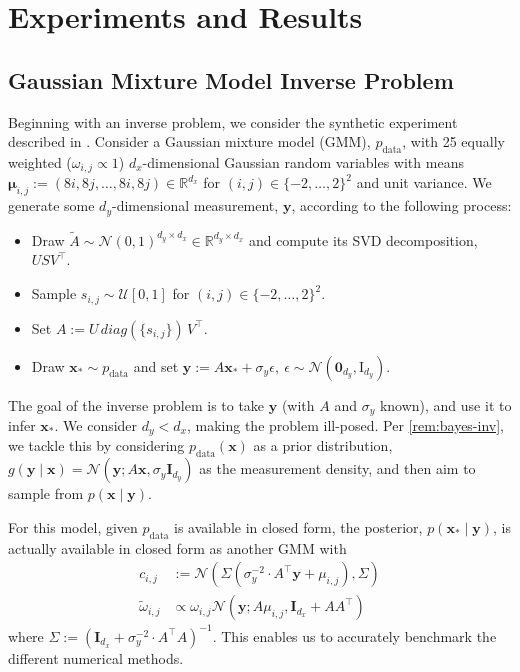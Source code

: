 \chapter{Experiments and Results} \label{chap:experiments}

\section{Gaussian Mixture Model Inverse Problem} \label{sec:gmm}

Beginning with an inverse problem, we consider the synthetic experiment described in
\textcite{cardosoMonteCarloGuided2023,boysTweedieMomentProjected2023}.
Consider a Gaussian mixture model (GMM), $p_{\text{data}}$, with 25 equally weighted
($\omega_{i,j} \propto 1$) $d_x$-dimensional Gaussian random variables with means
$\mathbf{\mu}_{i,j} := (8i, 8j, \dots, 8i, 8j) \in \mathbb{R}^{d_x}$
for $(i, j)\in \{-2, \ldots, 2\}^2$ and unit variance.
We generate some $d_y$-dimensional measurement, $\mathbf{y}$, according to the following process:
\begin{itemize}
    \item Draw $\tilde{A} \sim \mathcal{N}(0, 1)^{d_y \times d_x} \in \mathbb{R}^{d_y \times d_x}$
    and compute its SVD decomposition, $USV^\top$.
    \item Sample $s_{i,j} \sim \mathcal{U}[0,1]$ for $(i,j) \in \{-2, \dots, 2\}^2$.
    \item Set $A := U\, diag(\{s_{i,j}\})\, V^\top$.
    \item Draw $\mathbf{x}_* \sim p_{\text{data}}$ and set $\mathbf{y} := A\mathbf{x}_* + \sigma_y\epsilon,\ \epsilon \sim \mathcal{N}(\mathbf{0}_{d_y}, \mathrm{I}_{d_y})$.
\end{itemize}

The goal of the inverse problem is to take $\mathbf{y}$ (with $A$ and $\sigma_y$ known), and use
it to infer $\mathbf{x}_*$. We consider $d_y < d_x$, making the problem ill-posed. Per
\autoref{rem:bayes-inv}, we tackle this by considering $p_{\text{data}}(\mathbf{x})$ as a prior
distribution,
$g(\mathbf{y} \mid \mathbf{x}) = \mathcal{N}(\mathbf{y}; A\mathbf{x}, \sigma_y\mathbf{I}_{d_y})$
as the measurement density, and then aim to sample from $p(\mathbf{x} \mid \mathbf{y})$.

For this model, given $p_{\text{data}}$ is available in closed form, the posterior,
$p(\mathbf{x}_* \mid \mathbf{y})$, is actually available in closed form as another GMM with
\begin{align*}
    c_{i,j} &:= \mathcal{N}\left(\Sigma\left(\sigma_y^{-2}\cdot A^\top\mathbf{y} + \mu_{i,j}\right), \Sigma\right) \\
    \tilde{\omega}_{i,j} &\propto \omega_{i,j} \mathcal{N}\left(\mathbf{y}; A\mu_{i,j}, \mathbf{I}_{d_x} + AA^\top \right)
\end{align*}
where $\Sigma := \left(\mathbf{I}_{d_x} + \sigma_y^{-2}\cdot A^\top A\right)^{-1}$. This enables
us to accurately benchmark the different numerical methods.

